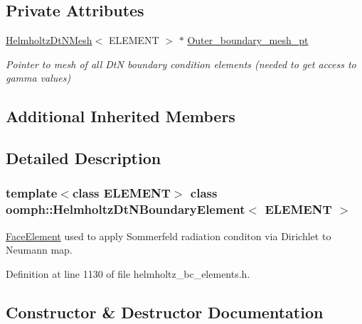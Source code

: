 \subsection*{Private Attributes}
\begin{DoxyCompactItemize}
\item 
\hyperlink{classoomph_1_1HelmholtzDtNMesh}{Helmholtz\+Dt\+N\+Mesh}$<$ E\+L\+E\+M\+E\+NT $>$ $\ast$ \hyperlink{classoomph_1_1HelmholtzDtNBoundaryElement_ae72d72e1442234fc262d8151307efacb}{Outer\+\_\+boundary\+\_\+mesh\+\_\+pt}
\begin{DoxyCompactList}\small\item\em Pointer to mesh of all DtN boundary condition elements (needed to get access to gamma values) \end{DoxyCompactList}\end{DoxyCompactItemize}
\subsection*{Additional Inherited Members}


\subsection{Detailed Description}
\subsubsection*{template$<$class E\+L\+E\+M\+E\+NT$>$\newline
class oomph\+::\+Helmholtz\+Dt\+N\+Boundary\+Element$<$ E\+L\+E\+M\+E\+N\+T $>$}

\hyperlink{classoomph_1_1FaceElement}{Face\+Element} used to apply Sommerfeld radiation conditon via Dirichlet to Neumann map. 

Definition at line 1130 of file helmholtz\+\_\+bc\+\_\+elements.\+h.



\subsection{Constructor \& Destructor Documentation}
\mbox{\label{classoomph_1_1HelmholtzDtNBoundaryElement_a2d4a2e2bda9e359efe709b042b7948fe}} 
